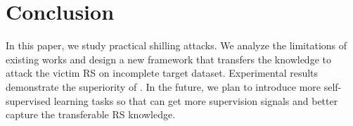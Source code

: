 

\section{Conclusion}
\label{sec:con}

In this paper, we study practical shilling attacks. 
We analyze the limitations of existing works and design a new framework \ours that transfers the knowledge to attack the victim RS on incomplete target dataset.
Experimental results demonstrate the superiority of \ours.
In the future, we plan to introduce more self-supervised learning tasks so that \ours can get more supervision signals and better capture the transferable RS knowledge.
